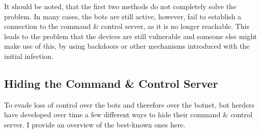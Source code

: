 \documentclass[10pt, a4paper, twocolumn]{article} %
\begin{document}
It should be noted, that the first two methods do not completely solve the problem. In many cases, the bots are still active, however, fail to establish a connection to the command \& control server, as it is no longer reachable. This leads to the problem that the devices are still vulnerable and someone else might make use of this, by using backdoors or other mechanisms introduced with the initial infection. 


\subsection{Hiding the Command \& Control Server}\label{hiding}
To evade loss of control over the bots and therefore over the botnet, bot herders have developed over time a few different ways to hide their command \& control server. I provide an overview of the best-known ones here.
\pagebreak
\end{document}
